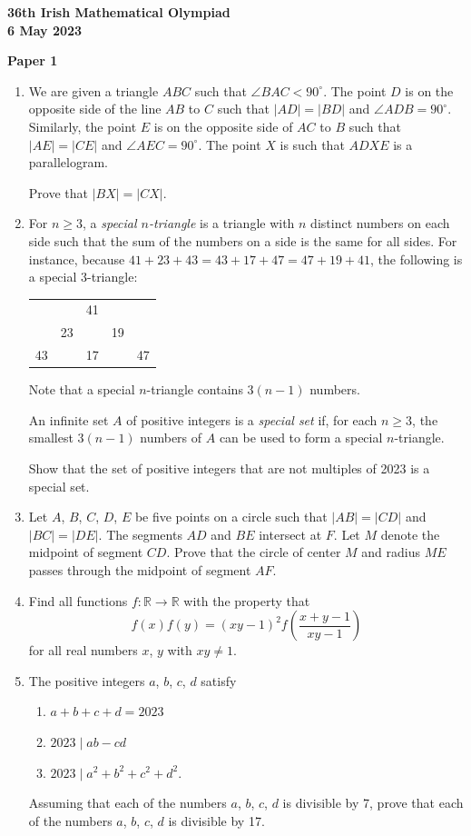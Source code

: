 \documentclass[12pt]{article}
\begin{document}
\begin{center}
{\large\bfseries 36th Irish Mathematical Olympiad\\6 May 2023}
\end{center}
\bigskip\noindent\textbf{Paper 1}\bigskip
\begin{enumerate}
\item We are given a triangle $ABC$ such that $\angle BAC < 90^\circ$. The point $D$ is on the opposite side of the line $AB$ to $C$ such that $|AD| = |BD|$ and $\angle ADB = 90^\circ$. Similarly, the point $E$ is on the opposite side of $AC$ to $B$ such that $|AE| = |CE|$ and $\angle AEC = 90^\circ$. The point $X$ is such that $ADXE$ is a parallelogram.

Prove that $|BX| = |CX|$.

\item For $n \ge 3$, a \textit{special $n$-triangle} is a triangle with $n$ distinct numbers on each side such that the sum of the numbers on a side is the same for all sides. For instance, because $41 + 23 + 43 = 43 + 17 + 47 = 47 + 19 + 41$, the following is a special 3-triangle:
\begin{center}
\begin{tabular}{ccccc}
& & 41 & & \\
& 23 & & 19 & \\
43 & & 17 & & 47
\end{tabular}
\end{center}
Note that a special $n$-triangle contains $3(n-1)$ numbers.

An infinite set $A$ of positive integers is a \textit{special set} if, for each $n \ge 3$, the smallest $3(n-1)$ numbers of $A$ can be used to form a special $n$-triangle.

Show that the set of positive integers that are not multiples of 2023 is a special set.

\item Let $A$, $B$, $C$, $D$, $E$ be five points on a circle such that $|AB| = |CD|$ and $|BC| = |DE|$. The segments $AD$ and $BE$ intersect at $F$. Let $M$ denote the midpoint of segment $CD$. Prove that the circle of center $M$ and radius $ME$ passes through the midpoint of segment $AF$.

\item Find all functions $f : \mathbb{R} \to \mathbb{R}$ with the property that
\[
f(x)f(y) = (xy-1)^2 f\!\left(\frac{x+y-1}{xy-1}\right)
\]
for all real numbers $x$, $y$ with $xy \ne 1$.

\item The positive integers $a$, $b$, $c$, $d$ satisfy
\begin{enumerate}
\item[(i)] $a + b + c + d = 2023$
\item[(ii)] $2023 \mid ab - cd$
\item[(iii)] $2023 \mid a^2 + b^2 + c^2 + d^2$.
\end{enumerate}
Assuming that each of the numbers $a$, $b$, $c$, $d$ is divisible by 7, prove that each of the numbers $a$, $b$, $c$, $d$ is divisible by 17.
\end{enumerate}
\end{document}
